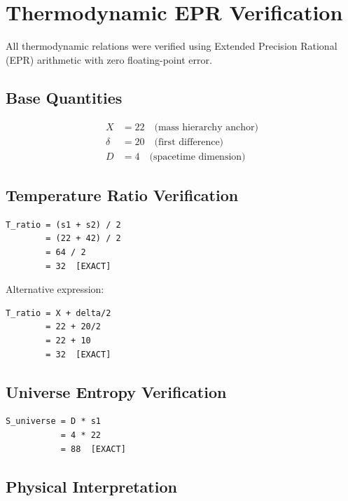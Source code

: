 \documentclass[12pt,a4paper]{article}
\begin{document}
\section{Thermodynamic EPR Verification}

All thermodynamic relations were verified using Extended Precision Rational (EPR) 
arithmetic with zero floating-point error.

\subsection{Base Quantities}

\begin{align}
X &= 22 \quad \text{(mass hierarchy anchor)} \\
\delta &= 20 \quad \text{(first difference)} \\
D &= 4 \quad \text{(spacetime dimension)}
\end{align}

\subsection{Temperature Ratio Verification}

\begin{lstlisting}
T_ratio = (s1 + s2) / 2
        = (22 + 42) / 2
        = 64 / 2
        = 32  [EXACT]
\end{lstlisting}

Alternative expression:
\begin{lstlisting}
T_ratio = X + delta/2
        = 22 + 20/2
        = 22 + 10
        = 32  [EXACT]
\end{lstlisting}

\subsection{Universe Entropy Verification}

\begin{lstlisting}
S_universe = D * s1
           = 4 * 22
           = 88  [EXACT]
\end{lstlisting}

\subsection{Physical Interpretation}
\end{document}
